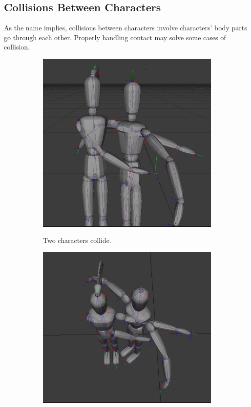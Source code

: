\subsection{Collisions Between Characters}
As the name implies, collisions between characters involve characters' body parts go through each other. Properly handling contact may solve some cases of collision.

\begin{figure}[h!]
	\centering
        \begin{subfigure}[b!]{0.45\textwidth}
        	\centering
                \includegraphics[width=\linewidth]{img/intersection}
                \label{fig:self}
                \caption{Two characters collide.}
        \end{subfigure}
        \quad
        \begin{subfigure}[b!]{0.45\textwidth}
        	\centering
                \includegraphics[width=\linewidth]{img/intersection1}

\end{subfigure}
\end{figure}
